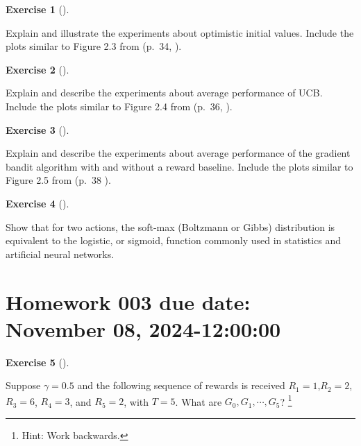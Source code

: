 \documentclass[
  letterpaper,
]{krantz}
\theoremstyle{plain}
\theoremstyle{definition}
\theoremstyle{definition}
\newtheorem{exercise}{Exercise}[chapter]
\theoremstyle{remark}
\begin{document}
\begin{exercise}[]\protect\hypertarget{exr-hw_002_03}{}\label{exr-hw_002_03}

Explain and illustrate the experiments about optimistic initial values.
Include the plots similar to Figure 2.3 from (p.~34,
).

\end{exercise}

\begin{exercise}[]\protect\hypertarget{exr-hw_002_04}{}\label{exr-hw_002_04}

Explain and describe the experiments about average performance of UCB.
Include the plots similar to Figure 2.4 from (p.~36,
).

\end{exercise}

\begin{exercise}[]\protect\hypertarget{exr-hw_002_05}{}\label{exr-hw_002_05}

Explain and describe the experiments about average performance of the
gradient bandit algorithm with and without a reward baseline. Include
the plots similar to Figure 2.5 from (p.~38
).

\end{exercise}

\begin{exercise}[]\protect\hypertarget{exr-hw_002_06}{}\label{exr-hw_002_06}

Show that for two actions, the soft-max (Boltzmann or Gibbs)
distribution is equivalent to the logistic, or sigmoid, function
commonly used in statistics and artificial neural networks.

\end{exercise}

\section{Homework 003 due date: November 08,
2024-12:00:00}\label{homework-003-due-date-november-08-2024-120000}

\begin{exercise}[]\protect\hypertarget{exr-hw_003_01}{}\label{exr-hw_003_01}

Suppose \(\gamma= 0.5\) and the following sequence of rewards is
received \(R_1 = 1\),\(R_2 = 2\), \(R_3 = 6\), \(R_4 = 3\), and
\(R_5 = 2\), with \(T = 5\). What are \(G_0 , G_1 , \cdots, G_5\)?
\footnote{Hint: Work backwards.}

\end{exercise}
\end{document}
